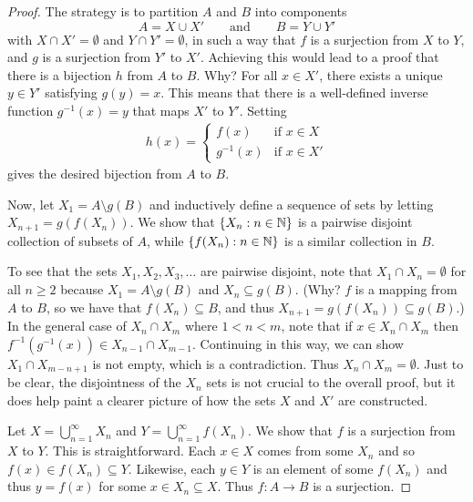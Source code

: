 \documentclass[11pt,twoside=off,numbers=noenddot]{scrbook}
\begin{document}
\begin{proof}
    The strategy is to partition $A$ and $B$ into components
    \[ A = X \cup X' \qquad \text{and} \qquad B = Y \cup Y' \]
    with $X \cap X' = \emptyset$ and $Y \cap Y' = \emptyset$, in such a way that $f$ is a surjection from $X$ to $Y$, and $g$ is a surjection from $Y'$ to $X'$. Achieving this would lead to a proof that there is a bijection $h$ from $A$ to $B$. Why? For all $x \in X'$, there exists a unique $y \in Y'$ satisfying $g(y) = x$. This means that there is a well-defined inverse function $g^{-1}(x) = y$ that maps $X'$ to $Y'$. Setting
    \begin{align*}
        h(x) = \begin{cases}
            f(x) & \text{if $x \in X$} \\
            g^{-1}(x) & \text{if $x \in X'$}
        \end{cases}
    \end{align*}
    gives the desired bijection from $A$ to $B$.

    Now, let $X_1 = A \setminus g(B)$ and inductively define a sequence of sets by letting $X_{n + 1} = g(f(X_n))$. We show that $\{ X_n : n \in \mathbb N \}$ is a pairwise disjoint collection of subsets of $A$, while $\{ f(X_n) : n \in \mathbb N \}$ is a similar collection in $B$.

    To see that the sets $X_1, X_2, X_3, \dots$ are pairwise disjoint, note that $X_1 \cap X_n = \emptyset$ for all $n \geq 2$ because $X_1 = A \setminus g(B)$ and $X_n \subseteq g(B)$. (Why? $f$ is a mapping from $A$ to $B$, so we have that $f(X_n) \subseteq B$, and thus $X_{n + 1} = g(f(X_n)) \subseteq g(B)$.) In the general case of $X_n \cap X_m$ where $1 < n < m$, note that if $x \in X_n \cap X_m$ then $f^{-1}(g^{-1}(x)) \in X_{n - 1} \cap X_{m - 1}$. Continuing in this way, we can show $X_1 \cap X_{m - n + 1}$ is not empty, which is a contradiction. Thus $X_n \cap X_m = \emptyset$. Just to be clear, the disjointness of the $X_n$ sets is not crucial to the overall proof, but it does help paint a clearer picture of how the sets $X$ and $X'$ are constructed.

    Let $X = \bigcup_{n = 1}^{\infty} X_n$ and $Y = \bigcup_{n = 1}^{\infty} f(X_n)$. We show that $f$ is a surjection from $X$ to $Y$. This is straightforward. Each $x \in X$ comes from some $X_n$ and so $f(x) \in f(X_n) \subseteq Y$. Likewise, each $y \in Y$ is an element of some $f(X_n)$ and thus $y = f(x)$ for some $x \in X_n \subseteq X$. Thus $f : A \to B$ is a surjection.


\end{proof}
\end{document}

